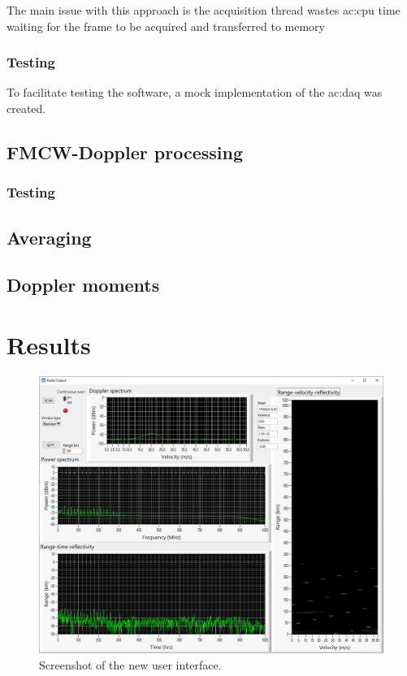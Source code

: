 \documentclass{article}
\begin{document}
The main issue with this approach is the acquisition thread wastes \acrshort{ac:cpu} time waiting for the frame to be acquired and transferred to memory


\subsubsection{Testing}
To facilitate testing the software, a mock implementation of the \acrshort{ac:daq} was created. 

\subsection{FMCW-Doppler processing}


\subsubsection{Testing}

\subsection{Averaging}
\subsection{Doppler moments}

\section{Results}

\begin{figure}
	\centering
	\includegraphics[width=\textwidth]{working-cloud}
	\caption{Screenshot of the new user interface.}
	\label{fig:WorkingCloud}
\end{figure}
\end{document}
